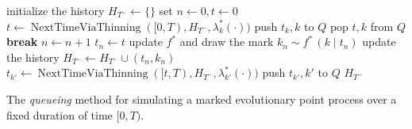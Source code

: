 \documentclass{juliacon}
\begin{document}
\begin{algorithm}[h]
\begin{algorithmic}[1]
  \Procedure{QueueingMethod}{\( [0, T) \), \( \lambda_{k}^\ast \), \( f_{k}^\ast \),}
    \State initialize the history \( H_{T^-} \leftarrow \{ \} \)
    \State set \( n \leftarrow 0, t \leftarrow 0 \)
      \State \( t \leftarrow \operatorname{NextTimeViaThinning}([0, T), H_{T^-}, \lambda_{k}^\ast(\cdot)) \)
      \State push \( t_{k}, k \) to \( Q \)
    \EndFor
      \State pop \( t, k \) from \( Q \)
        \State \textbf{break}
      \EndIf
      \State \( n \leftarrow n + 1 \)
      \State \( t_n \leftarrow t \)
      \State update  \( f^\ast \) and draw the mark \( k_n \sim f^\ast \, (k \mid t_n) \)
      \State update the history \( H_{T^-} \leftarrow H_{T^-} \cup (t_n, k_n) \)
        \State \( t_{k'} \leftarrow \operatorname{NextTimeViaThinning}([t, T), H_{T^-}, \lambda_{k'}^\ast(\cdot)) \)
        \State push \( t_{k'}, k' \) to \( Q \)
      \EndFor
    \EndWhile
    \State \Return \( H_{T^-} \)
  \EndProcedure
\end{algorithmic}
\caption{The \textit{queueing} method for simulating a marked evolutionary point process over a fixed duration of time \( [0, T) \).}
\label{algo:sim-queueing}
\end{algorithm}



\end{document}
